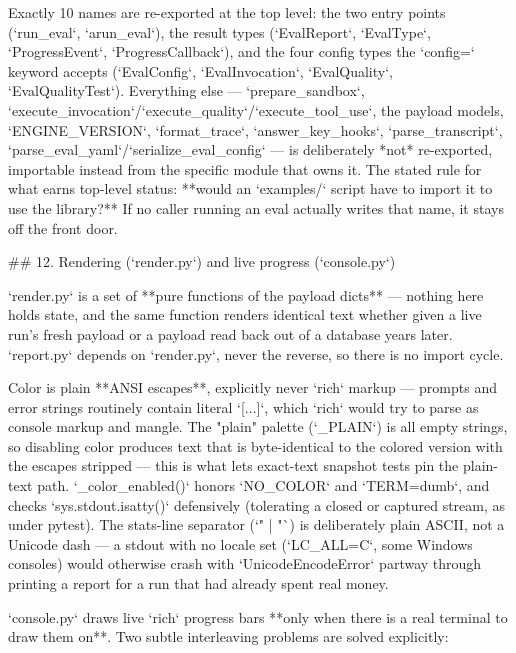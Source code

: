 Exactly 10 names are re-exported at the top level: the two entry points (`run_eval`, `arun_eval`), the result types (`EvalReport`, `EvalType`, `ProgressEvent`, `ProgressCallback`), and the four config types the `config=` keyword accepts (`EvalConfig`, `EvalInvocation`, `EvalQuality`, `EvalQualityTest`). Everything else — `prepare_sandbox`, `execute_invocation`/`execute_quality`/`execute_tool_use`, the payload models, `ENGINE_VERSION`, `format_trace`, `answer_key_hooks`, `parse_transcript`, `parse_eval_yaml`/`serialize_eval_config` — is deliberately *not* re-exported, importable instead from the specific module that owns it. The stated rule for what earns top-level status: **would an `examples/` script have to import it to use the library?** If no caller running an eval actually writes that name, it stays off the front door.

## 12. Rendering (`render.py`) and live progress (`console.py`)

`render.py` is a set of **pure functions of the payload dicts** — nothing here holds state, and the same function renders identical text whether given a live run's fresh payload or a payload read back out of a database years later. `report.py` depends on `render.py`, never the reverse, so there is no import cycle.

Color is plain **ANSI escapes**, explicitly never `rich` markup — prompts and error strings routinely contain literal `[...]`, which `rich` would try to parse as console markup and mangle. The "plain" palette (`_PLAIN`) is all empty strings, so disabling color produces text that is byte-identical to the colored version with the escapes stripped — this is what lets exact-text snapshot tests pin the plain-text path. `_color_enabled()` honors `NO_COLOR` and `TERM=dumb`, and checks `sys.stdout.isatty()` defensively (tolerating a closed or captured stream, as under pytest). The stats-line separator (`" | "`) is deliberately plain ASCII, not a Unicode dash — a stdout with no locale set (`LC_ALL=C`, some Windows consoles) would otherwise crash with `UnicodeEncodeError` partway through printing a report for a run that had already spent real money.

`console.py` draws live `rich` progress bars **only when there is a real terminal to draw them on**. Two subtle interleaving problems are solved explicitly:

